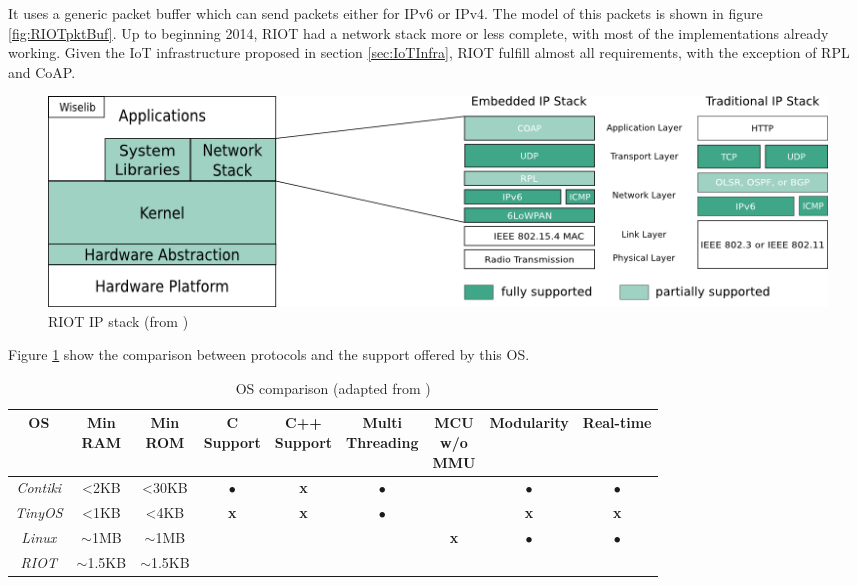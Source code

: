 It uses a generic packet buffer which can send packets either for IPv6 or IPv4.
The model of this packets is shown in figure \ref{fig:RIOTpktBuf}.
Up to beginning 2014, RIOT had a network stack more or less complete, with most of the implementations already working.
Given the IoT infrastructure proposed in section \ref{sec:IoTInfra}, RIOT fulfill almost all requirements, with the exception of RPL and CoAP.

\begin{figure}[htb]
	\centering
	\includegraphics[width=1\columnwidth]{chapters/background.images/RIOTIPStack.png}
	\caption{RIOT IP stack (from \cite{riotOS})}
	\label{fig:RIOTIPStack}
\end{figure}

Figure \ref{fig:RIOTIPStack} show the comparison between protocols and the support offered by this OS. 

\begin{table}[htb]
	\scriptsize
	\centering
	\caption{OS comparison (adapted from \cite{baccelli2013riot})}
	\label{tab:OSComparison}
	\begin{tabular}{|c|cccccccc}
		\hline
		\textbf{OS} & 
		\multicolumn{1}{p{0.8cm}|}{\textbf{Min} \newline \textbf{RAM}} &
		\multicolumn{1}{p{0.8cm}|}{\textbf{Min} \newline \textbf{ROM}} &
		\multicolumn{1}{p{1.3cm}|}{\textbf{C} \newline \textbf{Support}} &
		\multicolumn{1}{p{1.3cm}|}{\textbf{C++} \newline \textbf{Support}} &
		\multicolumn{1}{p{1.6cm}|}{\textbf{Multi} \newline \textbf{Threading}} &
		\multicolumn{1}{p{1cm}|}{\textbf{MCU} \newline \textbf{w/o} \newline \textbf{MMU}} &
		\multicolumn{1}{c|}{\textbf{Modularity}} &
		\multicolumn{1}{c|}{\textbf{Real-time}} \\ \hline
		\textit{Contiki} & \textless 2KB & \textless 30KB &$\bullet$ & \textbf{x}       & $\bullet$     & \checkmark     &$\bullet$ &    $\bullet$ \\ \cline{1-1}
		\textit{TinyOS}  & \textless 1KB & \textless 4KB  &\textbf{x}& \textbf{x}       & $\bullet$     & \checkmark     &\textbf{x}&   \textbf{x}\\ \cline{1-1}
		\textit{Linux}   & $\mathtt{\sim}$1MB &$\mathtt{\sim}$1MB&\checkmark & \checkmark       &  \checkmark   & \textbf{x} &$\bullet$   &$\bullet$    \\ \cline{1-1}
		\textit{RIOT} & $\mathtt{\sim}$1.5KB & $\mathtt{\sim}$1.5KB & \checkmark    & \checkmark       & \checkmark & \checkmark & \checkmark & \checkmark  \\ \cline{1-1}
	\end{tabular}
\end{table}


